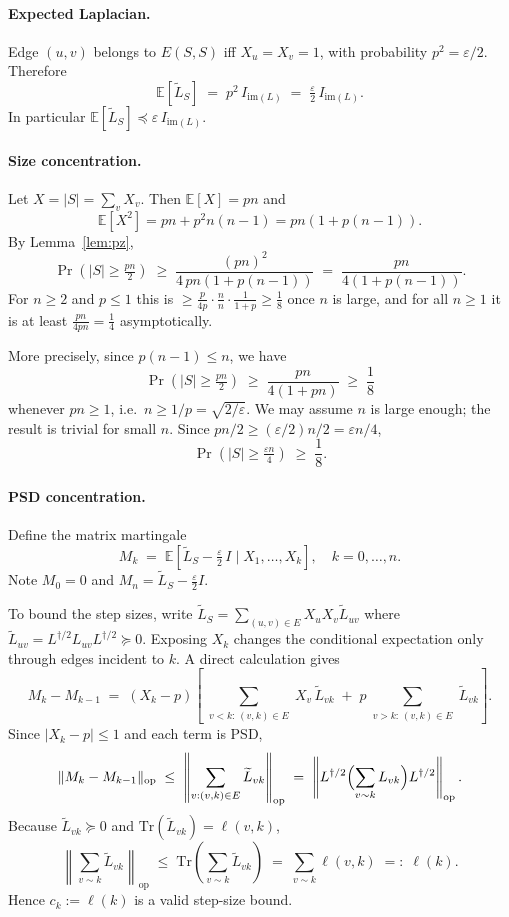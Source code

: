\documentclass[12pt]{article}
\theoremstyle{definition}
\theoremstyle{remark}
\begin{document}
\paragraph{Expected Laplacian.}
Edge $(u,v)$ belongs to $E(S,S)$ iff $X_u = X_v = 1$, with probability
$p^2 = \varepsilon/2$.  Therefore
\[
  \mathbb{E}[\widetilde{L}_S] \;=\; p^2\,I_{\mathrm{im}(L)} \;=\; \tfrac{\varepsilon}{2}\,I_{\mathrm{im}(L)}.
\]
In particular $\mathbb{E}[\widetilde{L}_S] \preceq \varepsilon\,I_{\mathrm{im}(L)}$.

\paragraph{Size concentration.}
Let $X = |S| = \sum_v X_v$.  Then $\mathbb{E}[X] = pn$ and
\[
  \mathbb{E}[X^2] = pn + p^2 n(n-1) = pn(1 + p(n-1)).
\]
By Lemma~\ref{lem:pz},
\[
  \Pr\!\left(|S| \ge \tfrac{pn}{2}\right)
  \;\ge\; \frac{(pn)^2}{4\,pn(1+p(n-1))}
  \;=\; \frac{pn}{4(1+p(n-1))}.
\]
For $n \ge 2$ and $p \le 1$ this is $\ge \frac{p}{4p} \cdot \frac{n}{n} \cdot
\frac{1}{1 + p} \ge \frac{1}{8}$ once $n$ is large, and for all $n \ge 1$ it
is at least $\frac{pn}{4pn} = \frac{1}{4}$ asymptotically.

More precisely, since $p(n-1) \le n$, we have
\[
  \Pr\!\left(|S| \ge \tfrac{pn}{2}\right) \;\ge\; \frac{pn}{4(1+pn)} \;\ge\; \frac{1}{8}
\]
whenever $pn \ge 1$, i.e.\ $n \ge 1/p = \sqrt{2/\varepsilon}$.  We may assume $n$ is large enough;
the result is trivial for small $n$.  Since $pn/2 \ge (\varepsilon/2)n/2 = \varepsilon n/4$,
\begin{equation}\label{eq:size}
  \Pr\!\left(|S| \ge \tfrac{\varepsilon n}{4}\right) \;\ge\; \frac{1}{8}.
\end{equation}

\paragraph{PSD concentration.}
Define the matrix martingale
\[
  M_k \;=\; \mathbb{E}\!\left[\widetilde{L}_S - \tfrac{\varepsilon}{2}\,I \;\Big|\; X_1,\ldots,X_k\right], \quad k = 0,\ldots,n.
\]
Note $M_0 = 0$ and $M_n = \widetilde{L}_S - \frac{\varepsilon}{2}I$.

To bound the step sizes, write $\widetilde{L}_S = \sum_{(u,v)\in E}X_u X_v \widetilde{L}_{uv}$
where $\widetilde{L}_{uv} = L^{\dagger/2}L_{uv}L^{\dagger/2} \succeq 0$.
Exposing $X_k$ changes the conditional expectation only through edges incident to $k$.  A
direct calculation gives
\[
  M_k - M_{k-1} \;=\; (X_k - p)\left[\sum_{\substack{v<k:\,(v,k)\in E}} X_v\,\widetilde{L}_{vk}
    \;+\; p\!\sum_{\substack{v>k:\,(v,k)\in E}}\widetilde{L}_{vk}\right].
\]
Since $|X_k - p| \le 1$ and each term is PSD,
\[
  \|M_k - M_{k-1}\|_{\mathrm{op}}
  \;\le\; \left\|\sum_{v:(v,k)\in E}\widetilde{L}_{vk}\right\|_{\mathrm{op}}
  \;=\; \left\|L^{\dagger/2}\Bigl(\sum_{v\sim k}L_{vk}\Bigr)L^{\dagger/2}\right\|_{\mathrm{op}}.
\]
Because $\widetilde{L}_{vk} \succeq 0$ and $\mathrm{Tr}(\widetilde{L}_{vk}) = \ell(v,k)$,
\[
  \left\|\sum_{v\sim k}\widetilde{L}_{vk}\right\|_{\mathrm{op}}
  \;\le\; \mathrm{Tr}\!\left(\sum_{v\sim k}\widetilde{L}_{vk}\right)
  \;=\; \sum_{v\sim k}\ell(v,k) \;=:\; \ell(k).
\]
Hence $c_k := \ell(k)$ is a valid step-size bound.
\end{document}
